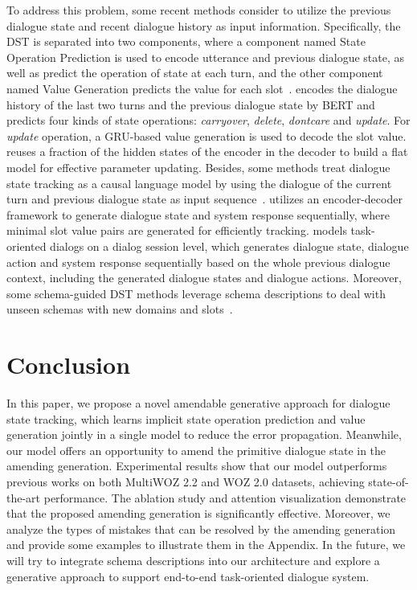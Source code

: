 \documentclass[11pt]{article}
\begin{document}
To address this problem, some recent methods consider to utilize the previous dialogue state and recent dialogue history as input information. Specifically, the DST is separated into two components, where a component named State Operation Prediction is used to encode utterance and previous dialogue state, as well as predict the operation of state at each turn, and the other component named Value Generation predicts the value for each slot~\citep{kim-etal-2020-efficient,zeng2020multi}. 
\citet{kim-etal-2020-efficient} encodes the dialogue history of the last two turns and the previous dialogue state by BERT and predicts four kinds of state operations: \textit{carryover}, \textit{delete}, \textit{dontcare} and \textit{update}. For \textit{update} operation, a GRU-based value generation is used to decode the slot value.
\citet{zeng2020multi} reuses a fraction of the hidden states of the encoder in the decoder to build a flat model for effective parameter updating.
Besides, some methods treat dialogue state tracking as a causal language model by using the dialogue of the current turn and previous dialogue state as input sequence~\citep{lin-etal-2020-mintl,yang2021ubar}. \citet{lin-etal-2020-mintl} utilizes an encoder-decoder framework to generate dialogue state and system response sequentially, where minimal slot value pairs are generated for efficiently tracking. \citet{yang2021ubar} models task-oriented dialogs on a dialog session level, which generates dialogue state, dialogue action and system response sequentially based on the whole previous dialogue context, including the generated dialogue states and dialogue actions. 
Moreover, some schema-guided DST methods leverage schema descriptions to deal with unseen schemas with new domains and slots~\citep{zhu-etal-2020-efficient,feng-etal-2021-sequence,noroozi2020fast}.



\section{Conclusion}

In this paper, we propose a novel amendable generative approach for dialogue state tracking, which learns implicit state operation prediction and value generation jointly in a single model to reduce the error propagation. Meanwhile, our model offers an opportunity to amend the primitive dialogue state in the amending generation. Experimental results show that our model outperforms previous works on both MultiWOZ 2.2 and WOZ 2.0 datasets, achieving state-of-the-art performance. The ablation study and attention visualization demonstrate that the proposed amending generation is significantly effective. Moreover, we analyze the types of mistakes that can be resolved by the amending generation and provide some examples to illustrate them in the Appendix. In the future, we will try to integrate schema descriptions into our architecture and explore a generative approach to support end-to-end task-oriented dialogue system.
\end{document}
